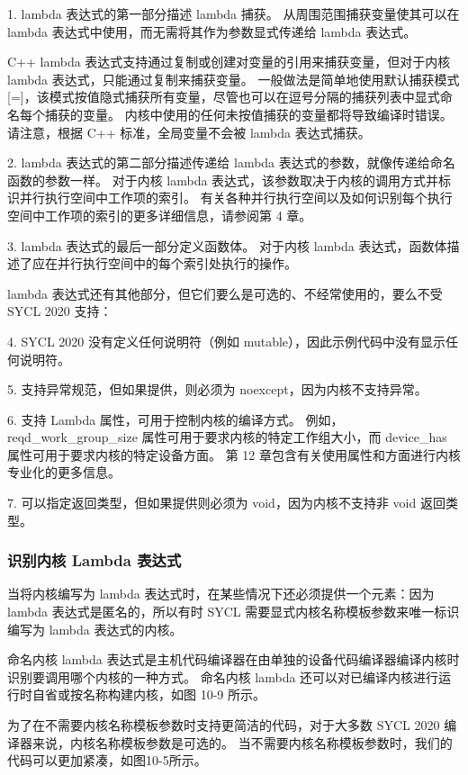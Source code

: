 1. lambda 表达式的第一部分描述 lambda 捕获。 从周围范围捕获变量使其可以在 lambda 表达式中使用，而无需将其作为参数显式传递给 lambda 表达式。

C++ lambda 表达式支持通过复制或创建对变量的引用来捕获变量，但对于内核 lambda 表达式，只能通过复制来捕获变量。 一般做法是简单地使用默认捕获模式 [=]，该模式按值隐式捕获所有变量，尽管也可以在逗号分隔的捕获列表中显式命名每个捕获的变量。 内核中使用的任何未按值捕获的变量都将导致编译时错误。 请注意，根据 C++ 标准，全局变量不会被 lambda 表达式捕获。

2. lambda 表达式的第二部分描述传递给 lambda 表达式的参数，就像传递给命名函数的参数一样。 对于内核 lambda 表达式，该参数取决于内核的调用方式并标识并行执行空间中工作项的索引。 有关各种并行执行空间以及如何识别每个执行空间中工作项的索引的更多详细信息，请参阅第 4 章。

3. lambda 表达式的最后一部分定义函数体。 对于内核 lambda 表达式，函数体描述了应在并行执行空间中的每个索引处执行的操作。

lambda 表达式还有其他部分，但它们要么是可选的、不经常使用的，要么不受 SYCL 2020 支持：

4. SYCL 2020 没有定义任何说明符（例如 mutable），因此示例代码中没有显示任何说明符。

5. 支持异常规范，但如果提供，则必须为 noexcept，因为内核不支持异常。

6. 支持 Lambda 属性，可用于控制内核的编译方式。 例如，reqd\_work\_group\_size 属性可用于要求内核的特定工作组大小，而 device\_has 属性可用于要求内核的特定设备方面。 第 12 章包含有关使用属性和方面进行内核专业化的更多信息。

7. 可以指定返回类型，但如果提供则必须为 void，因为内核不支持非 void 返回类型。

\subsubsection{识别内核 Lambda 表达式}
当将内核编写为 lambda 表达式时，在某些情况下还必须提供一个元素：因为 lambda 表达式是匿名的，所以有时 SYCL 需要显式内核名称模板参数来唯一标识编写为 lambda 表达式的内核。

命名内核 lambda 表达式是主机代码编译器在由单独的设备代码编译器编译内核时识别要调用哪个内核的一种方式。 命名内核 lambda 还可以对已编译内核进行运行时自省或按名称构建内核，如图 10-9 所示。

为了在不需要内核名称模板参数时支持更简洁的代码，对于大多数 SYCL 2020 编译器来说，内核名称模板参数是可选的。 当不需要内核名称模板参数时，我们的代码可以更加紧凑，如图10-5所示。

